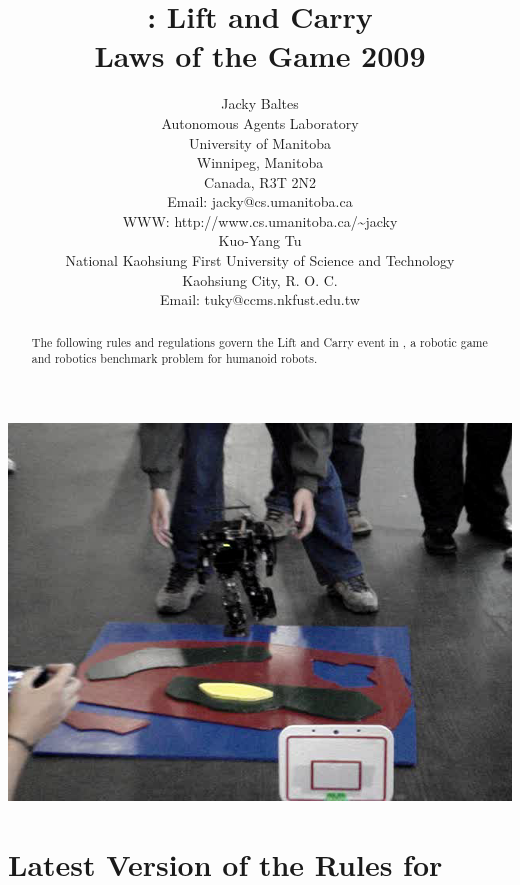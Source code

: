 \documentclass[12pt]{hurocup}
\begin{document}
\title{\HuroCup: Lift and Carry\\
  Laws of the Game 2009}

\author{Jacky Baltes\\
Autonomous Agents Laboratory\\
University of Manitoba\\
Winnipeg, Manitoba\\
Canada, R3T 2N2\\
Email: jacky@cs.umanitoba.ca\\
WWW: http://www.cs.umanitoba.ca/\~{ }jacky\\[5mm]
Kuo-Yang Tu\\
National Kaohsiung First University of Science and Technology\\
Kaohsiung City, R. O. C.\\
Email: tuky@ccms.nkfust.edu.tw\\
}

\maketitle

\begin{center}
 \includegraphics[width=0.7\linewidth]{Figures/lift-and-carry-life}
\end{center}

\begin{abstract}
The following rules and regulations govern the Lift and Carry event in
\HuroCup, a robotic game and robotics benchmark problem for humanoid
robots.
%
\end{abstract}

\section*{Latest Version of the Rules for \HuroCup}
\label{sec:updates}
\end{document}
